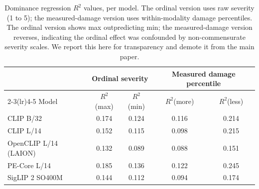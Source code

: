\begin{table}[h]
\centering
\caption{Dominance regression $R^2$ values, per model. The ordinal version uses raw severity (1 to 5); the measured-damage version uses within-modality damage percentiles. The ordinal version shows max outpredicting min; the measured-damage version reverses, indicating the ordinal effect was confounded by non-commensurate severity scales. We report this here for transparency and demote it from the main paper.}
\label{tab:t4_dominance}
\footnotesize
\begin{tabular}{lcccc}
\toprule
 & \multicolumn{2}{c}{Ordinal severity} & \multicolumn{2}{c}{Measured damage percentile} \\
\cmidrule(lr){2-3}\cmidrule(lr){4-5}
Model & $R^2$(max) & $R^2$(min) & $R^2$(more) & $R^2$(less) \\
\midrule
CLIP B/32 & 0.174 & 0.124 & 0.116 & 0.214 \\
CLIP L/14 & 0.152 & 0.115 & 0.098 & 0.215 \\
OpenCLIP L/14 (LAION) & 0.132 & 0.089 & 0.088 & 0.151 \\
PE-Core L/14 & 0.185 & 0.136 & 0.122 & 0.245 \\
SigLIP 2 SO400M & 0.144 & 0.112 & 0.094 & 0.174 \\
\bottomrule
\end{tabular}
\end{table}